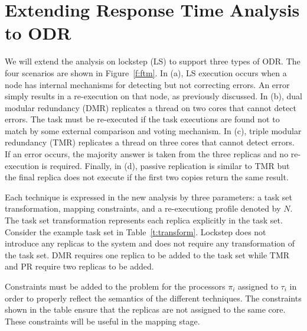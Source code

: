 \section{Extending Response Time Analysis to ODR}

	We will extend the analysis on lockstep (LS) to support three types of ODR. The four scenarios are shown in Figure~\ref{f:ftm}. 
	In (a), LS execution occurs when a node has internal mechanisms for detecting but not correcting errors. 
	An error simply results in a re-execution on that node, as previously discussed. 	
	In (b), dual modular redundancy (DMR) replicates a thread on two cores that cannot detect errors. 
	The task must be re-executed if the task executions are found not to match by some external comparison and voting mechanism.
	In (c), triple modular redundancy (TMR) replicates a thread on three cores that cannot detect errors. 
	If an error occurs, the majority answer is taken from the three replicas and no re-execution is required.
	Finally, in (d), passive replication is similar to TMR but the final replica does not execute if the first two copies return the same result. 


	
	Each technique is expressed in the new analysis by three parameters: a task set transformation, mapping constraints, and a re-executiong profile denoted by $N$.
	The task set transformation represents each replica explicitly in the task set. 
	Consider the example task set in Table~\ref{t:transform}. 
	Lockstep does not introduce any replicas to the system and does not require any transformation of the task set. 
	DMR requires one replica to be added to the task set while TMR and PR require two replicas to be added.
	
	Constraints must be added to the problem for the processors $\pi_i$ assigned to $\tau_i$ in order to properly reflect the semantics of the different techniques. 
	The constraints shown in the table ensure that the replicas are not assigned to the same core. 
	These constraints will be useful in the mapping stage.
	
